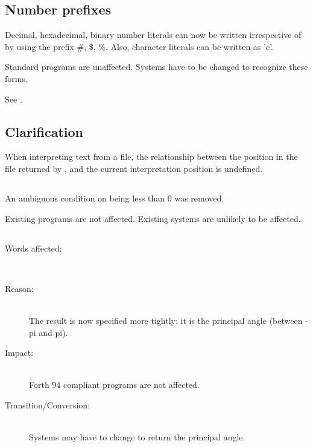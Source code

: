 \subsection{Number prefixes} %
 \label{diff:12:prefix}

Decimal, hexadecimal, binary number literals can now be written
irrespective of  by using the prefix \#, \$, \%.  Also, character
literals can be written as 'c'.
 
Standard programs are unaffected.  Systems have to be changed to
recognize these forms.

See .
 

\subsection[SOURCE-ID Clarification]{ Clarification} %
\label{diff:12:sourceid}

When interpreting text from a file, the relationship between the position in the
file returned by , and the current interpretation position is
undefined.


\subsection[FASINH]{} %
 \label{diff:12:fasinh}

An ambiguous condition on  being less than 0 was removed.

Existing programs are not affected.  Existing systems are
unlikely to be affected.


\subsection[FATAN2]{} %
\label{diff:12:fatan2}

\begin{description}
\item[Words affected:] ~\\

\item[Reason:] ~\\
	The result is now specified more tightly: it is the principal angle
	(between -pi and pi).

\item[Impact:] ~\\
	Forth 94 compliant programs are not affected.

\item[Transition/Conversion:] ~\\
	Systems may have to change  to return
	the principal angle.
\end{description}

